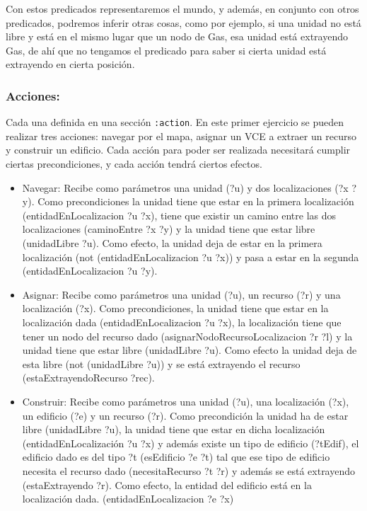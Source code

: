 \documentclass[10pt, spanish]{article}
\begin{document}
Con estos predicados representaremos el mundo, y además, en conjunto con otros predicados, podremos inferir otras cosas, como por ejemplo, si una unidad no está libre y está en el mismo lugar que un nodo de Gas, esa unidad está extrayendo Gas, de ahí que no tengamos el predicado para saber si cierta unidad está extrayendo en cierta posición.

\subsubsection{Acciones:}

Cada una definida en una sección \texttt{:action}. En este primer ejercicio se pueden realizar tres acciones: navegar por el mapa, asignar un VCE a extraer un recurso y construir un edificio. Cada acción para poder ser realizada necesitará cumplir ciertas precondiciones, y cada acción tendrá ciertos efectos.

\begin{itemize}
	\item Navegar: Recibe como parámetros una unidad (?u) y dos localizaciones (?x ?y). Como precondiciones la unidad tiene que estar en la primera localización (entidadEnLocalizacion ?u ?x), tiene que existir un camino entre las dos localizaciones (caminoEntre ?x ?y) y la unidad tiene que estar libre (unidadLibre ?u). Como efecto, la unidad deja de estar en la primera localización (not (entidadEnLocalizacion ?u ?x)) y pasa a estar en la segunda (entidadEnLocalizacion ?u ?y).
	\item Asignar: Recibe como parámetros una unidad (?u), un recurso (?r) y una localización (?x). Como precondiciones, la unidad tiene que estar en la localización dada (entidadEnLocalizacion ?u ?x), la localización tiene que tener un nodo del recurso dado (asignarNodoRecursoLocalizacion ?r ?l) y la unidad tiene que estar libre (unidadLibre ?u). Como efecto la unidad deja de esta libre (not (unidadLibre ?u)) y se está extrayendo el recurso (estaExtrayendoRecurso ?rec).
	\item Construir: Recibe como parámetros una unidad (?u), una localización (?x), un edificio (?e) y un recurso (?r). Como precondición la unidad ha de estar libre (unidadLibre ?u), la unidad tiene que estar en dicha localización (entidadEnLocalización ?u ?x) y además existe un tipo de edificio (?tEdif), el edificio dado es del tipo ?t (esEdificio ?e ?t) tal que ese tipo de edificio necesita el recurso dado (necesitaRecurso ?t ?r) y además se está extrayendo (estaExtrayendo ?r). Como efecto, la entidad del edificio está en la localización dada. (entidadEnLocalizacion ?e ?x)
\end{itemize}
\end{document}
